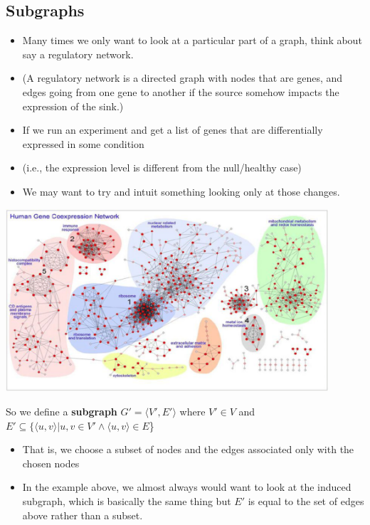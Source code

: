 \documentclass[10pt]{article}
\begin{document}
\subsection*{Subgraphs}
\begin{itemize}
	\item Many times we only want to look at a particular part of a graph, think about say a regulatory network.
	\item (A regulatory network is a directed graph with nodes that are genes, and edges going from one gene to another if the source somehow impacts the expression of the sink.)
	\item If we run an experiment and get a list of genes that are differentially expressed in some condition
	\item (i.e., the expression level is different from the null/healthy case)
	\item We may want to try and intuit something looking only at those changes.
\end{itemize}
\begin{center} 
	\includegraphics*[width=0.9\textwidth]{M4_5.png} 
\end{center}
So we define a \textbf{subgraph} $G' = \langle V', E' \rangle$ where $V' \in V$ and $E' \subseteq \{\langle u, v \rangle | u, v \in V' \land \langle u, v \rangle \in E$\}
\begin{itemize}
	\item That is, we choose a subset of nodes and the edges associated only with the chosen nodes
	\item In the example above, we almost always would want to look at the induced subgraph, which is basically the same thing but $E'$ is equal to  the set of edges above rather than a subset.
\end{itemize}
\end{document}
